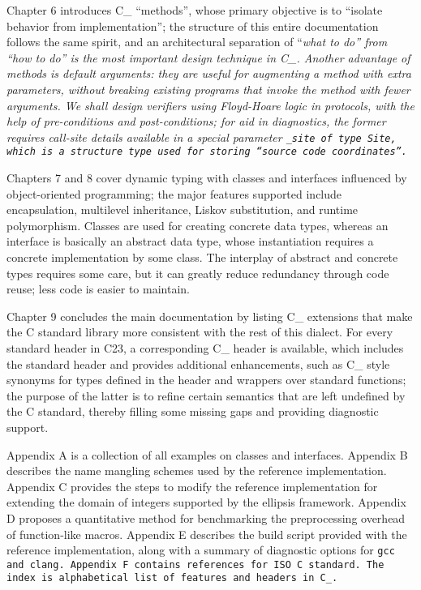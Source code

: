 Chapter 6 introduces C\_ ``methods'',
whose primary objective is to ``isolate behavior from implementation'';
the structure of this entire documentation follows the same spirit,
and an architectural separation of ``\it{what} to do'' from
``\it{how} to do'' is the most important design technique in C\_.
Another advantage of methods is default arguments:
they are useful for augmenting a method with extra parameters,
without breaking existing programs that invoke the method with fewer arguments.
We shall design verifiers using Floyd-Hoare logic in protocols,
with the help of pre-conditions and post-conditions;
for aid in diagnostics, the former requires call-site details
available in a special parameter \tt{_site} of type \tt{Site},
which is a structure type used for storing ``source code coordinates''.

Chapters 7 and 8 cover dynamic typing with classes and interfaces influenced by
object-oriented programming; the major features supported include encapsulation,
multilevel inheritance, Liskov substitution, and runtime polymorphism.
Classes are used for creating concrete data types,
whereas an interface is basically an abstract data type,
whose instantiation requires a concrete implementation by some class.
The interplay of abstract and concrete types requires some care, but it can
greatly reduce redundancy through code reuse; less code is easier to maintain.

Chapter 9 concludes the main documentation by listing C\_ extensions that
make the C standard library more consistent with the rest of this dialect.
For every standard header in C23, a corresponding C\_ header is available,
which includes the standard header and provides additional enhancements,
such as C\_ style synonyms for types defined in the header and wrappers
over standard functions; the purpose of the latter is to
refine certain semantics that are left undefined by the C standard,
thereby filling some missing gaps and providing diagnostic support.

Appendix A is a collection of all examples on classes and interfaces.
Appendix B describes the name mangling schemes used by the reference implementation.
Appendix C provides the steps to modify the reference implementation for
extending the domain of integers supported by the ellipsis framework.
Appendix D proposes a quantitative method for benchmarking
the preprocessing overhead of function-like macros.
Appendix E describes the build script provided with the reference implementation,
along with a summary of diagnostic options for \tt{gcc} and \tt{clang}.
Appendix F contains references for ISO C standard.
The index is alphabetical list of features and headers in C\_.
